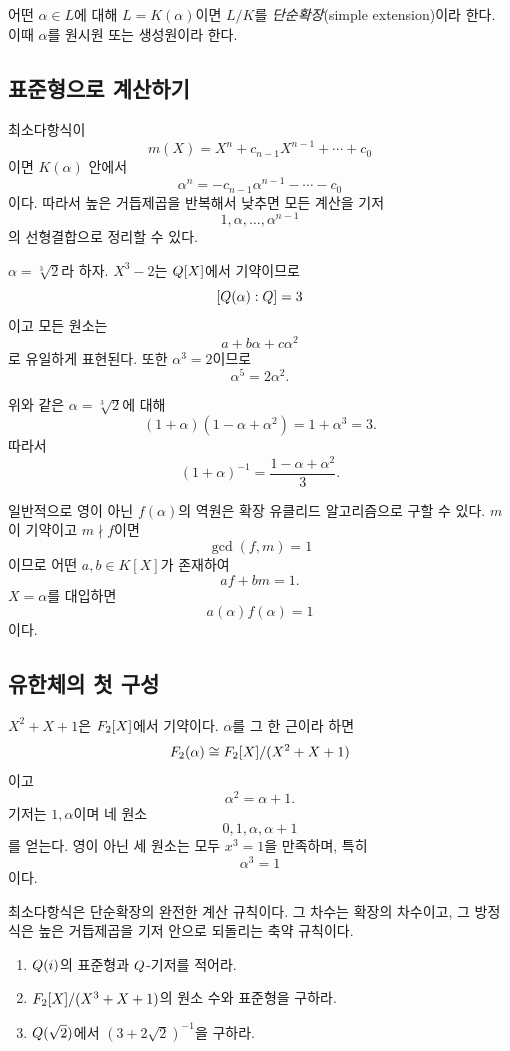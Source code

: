 \begin{definition}[단순확장]
어떤 $\alpha\in L$에 대해 $L=K(\alpha)$이면 $L/K$를 \emph{단순확장}(simple extension)이라 한다. 이때 $\alpha$를 원시원 또는 생성원이라 한다.
\end{definition}

\subsection{표준형으로 계산하기}

최소다항식이
\[
  m(X)=X^n+c_{n-1}X^{n-1}+\cdots+c_0
\]
이면 $K(\alpha)$ 안에서
\[
  \alpha^n=-c_{n-1}\alpha^{n-1}-\cdots-c_0
\]
이다. 따라서 높은 거듭제곱을 반복해서 낮추면 모든 계산을 기저
\[
  1,\alpha,\dots,\alpha^{n-1}
\]
의 선형결합으로 정리할 수 있다.

\begin{example}
$\alpha=\sqrt[3]{2}$라 하자. $X^3-2$는 $Q[X]$에서 기약이므로
\[
  [Q(\alpha):Q]=3
\]
이고 모든 원소는
\[
  a+b\alpha+c\alpha^2
\]
로 유일하게 표현된다. 또한 $\alpha^3=2$이므로
\[
  \alpha^5=2\alpha^2.
\]
\end{example}

\begin{example}[역원 계산]
위와 같은 $\alpha=\sqrt[3]{2}$에 대해
\[
  (1+\alpha)(1-\alpha+\alpha^2)=1+\alpha^3=3.
\]
따라서
\[
  (1+\alpha)^{-1}=\frac{1-\alpha+\alpha^2}{3}.
\]
\end{example}

일반적으로 영이 아닌 $f(\alpha)$의 역원은 확장 유클리드 알고리즘으로 구할 수 있다. $m$이 기약이고 $m\nmid f$이면
\[
  \gcd(f,m)=1
\]
이므로 어떤 $a,b\in K[X]$가 존재하여
\[
  af+bm=1.
\]
$X=\alpha$를 대입하면
\[
  a(\alpha)f(\alpha)=1
\]
이다.

\subsection{유한체의 첫 구성}

\begin{example}
$X^2+X+1$은 $F_2[X]$에서 기약이다. $\alpha$를 그 한 근이라 하면
\[
  F_2(\alpha)\cong F_2[X]/(X^2+X+1)
\]
이고
\[
  \alpha^2=\alpha+1.
\]
기저는 $1,\alpha$이며 네 원소
\[
  0,1,\alpha,\alpha+1
\]
를 얻는다. 영이 아닌 세 원소는 모두 $x^3=1$을 만족하며, 특히
\[
  \alpha^3=1
\]
이다.
\end{example}

\begin{keyidea}
최소다항식은 단순확장의 완전한 계산 규칙이다. 그 차수는 확장의 차수이고, 그 방정식은 높은 거듭제곱을 기저 안으로 되돌리는 축약 규칙이다.
\end{keyidea}

\begin{checkpoint}
\begin{enumerate}[label=(\alph*)]
  \item $Q(i)$의 표준형과 $Q$-기저를 적어라.
  \item $F_2[X]/(X^3+X+1)$의 원소 수와 표준형을 구하라.
  \item $Q(\sqrt2)$에서 $(3+2\sqrt2)^{-1}$을 구하라.
\end{enumerate}
\end{checkpoint}
